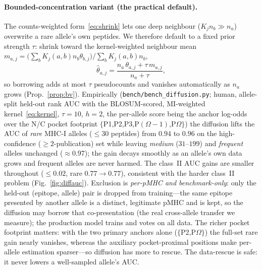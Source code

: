\documentclass[11pt]{article}
\theoremstyle{oldplain}
\theoremstyle{oldrem}
\begin{document}
\paragraph{Bounded-concentration variant (the practical default).} The counts-weighted
form~\eqref{eq:shrink} lets one deep neighbour ($K_j n_b\gg n_a$) overwrite a rare allele's own
peptides. We therefore default to a fixed prior strength $\tau$: shrink toward the kernel-weighted
neighbour mean $m_{a,j}=\big(\sum_{b}K_j(a,b)n_b\theta_{b,j}\big)/\sum_b K_j(a,b)n_b$,
\begin{equation}\label{eq:shrink-tau}
  \hat\theta_{a,j}=\frac{n_a\,\theta_{a,j}+\tau\,m_{a,j}}{n_a+\tau},
\end{equation}
so borrowing adds at most $\tau$ pseudocounts and vanishes automatically as $n_a$ grows
(Prop.~\ref{prop:bv}). Empirically (\texttt{bench/bench\_diffusion.py}; human, allele-split
held-out rank AUC with the BLOSUM-scored, MI-weighted kernel~\eqref{eq:kernel}, $\tau=10$, $h=2$, the
per-allele score being the anchor log-odds over the N/C pocket footprint
$\{$P1,P2,P3,P$(\Omega{-}1)$,P$\Omega\}$) the diffusion lifts the AUC of \emph{rare} MHC-I alleles
($\le 30$ peptides) from $0.94$ to $0.96$ on the high-confidence ($\ge2$-publication) set while
leaving \emph{medium} ($31$--$199$) and \emph{frequent} alleles unchanged ($\approx0.97$); the gain
decays smoothly as an allele's own data grows and frequent alleles are never harmed. The class~II
AUC gains are smaller throughout ($\le0.02$, rare $0.77\!\to\!0.77$), consistent with the harder
class~II problem (Fig.~\ref{fig:diffauc}). Exclusion
is \emph{per-pMHC and benchmark-only}: only the held-out (epitope, allele) pair is dropped from
training---the same epitope presented by another allele is a distinct, legitimate pMHC and is kept,
so the diffusion may borrow that co-presentation (the real cross-allele transfer we measure); the
production model trains and votes on all data. The richer pocket footprint matters: with the two
primary anchors alone ($\{$P2,P$\Omega\}$) the full-set rare gain nearly vanishes, whereas the
auxiliary pocket-proximal positions make per-allele estimation sparser---so diffusion has more to
rescue. The data-rescue is safe: it never lowers a well-sampled allele's AUC.
\end{document}
